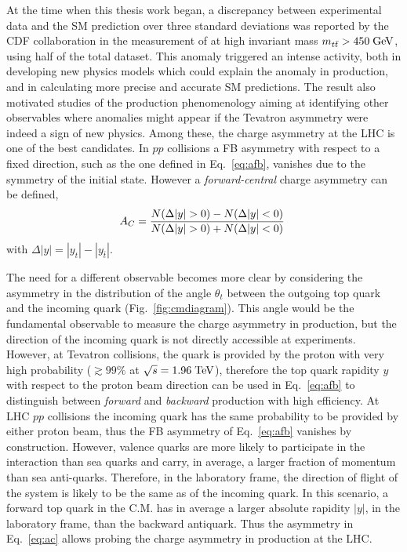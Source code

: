 At the time when this thesis work began, a discrepancy between
experimental data and the SM prediction over three standard deviations
was reported by the CDF collaboration in the measurement of \afb{} at
high \ttbar{} invariant mass $\mbox{$m_{t\bar{t}}$}{}>450\; \mathrm{GeV}{}$, using half of the
total dataset. This anomaly triggered an intense activity, both in
developing new physics models which could explain the anomaly in
\ttbar{} production, and in calculating more precise and accurate SM
predictions. The result also motivated studies of the \ttbar{}
production phenomenology aiming at identifying other observables where
anomalies might appear if the Tevatron asymmetry were indeed a
sign of new physics. Among these, the charge asymmetry at the LHC is
one of the best candidates. In $pp$ collisions a FB asymmetry with
respect to a fixed direction, such as the one defined in
Eq.~\ref{eq:afb}, vanishes due to the symmetry of the initial state.
However a {\it forward-central} charge asymmetry \ac{} can be defined, 
\begin{equation}
\label{eq:ac}
\ac{}=\frac{N(\Delta{}|y|>0)-N(\Delta{}|y|<0)}{N(\Delta{}|y|>0)+N(\Delta{}|y|<0)}
\phantom{,}
\end{equation}
with $\Delta{}|y|=|y_t| - |y_{\bar{t}}|$.

The need for a different observable becomes more clear by considering
the asymmetry in the distribution of the angle $\theta_t$ between the outgoing
top quark and the incoming quark (Fig.~\ref{fig:cmdiagram}). This angle
would be the fundamental observable to measure the charge asymmetry in
\ttbar{} production, but the direction of the incoming quark is
not directly accessible at experiments. However, at Tevatron \ppbar{}
collisions, the quark is provided by the proton with very high
probability ($\gtrsim{}99\%$ at $\sqrt{s}=1.96\; \mathrm{TeV}{}$), therefore the
top quark rapidity $y$ with respect to the proton beam direction can
be used in Eq.~\ref{eq:afb} to distinguish between {\it forward} and
{\it backward} production with high efficiency. At LHC $pp$ collisions
the incoming quark has the same probability to be provided by
either proton beam, thus the FB asymmetry of Eq.~\ref{eq:afb} vanishes by
construction. However, valence quarks are more likely to participate
in the interaction than sea quarks and carry, in average, a larger fraction of
momentum than sea anti-quarks. Therefore, in the laboratory frame, the
direction of flight of the \ttbar{} system is likely to be the same as of
the incoming quark. In this scenario, a forward top quark in
the \ttbar{} C.M. has in average a larger absolute rapidity $|y|$, in
the laboratory frame, than the backward antiquark. Thus the asymmetry
in Eq.~\ref{eq:ac} allows probing the charge asymmetry in \ttbar{}
production at the LHC.

